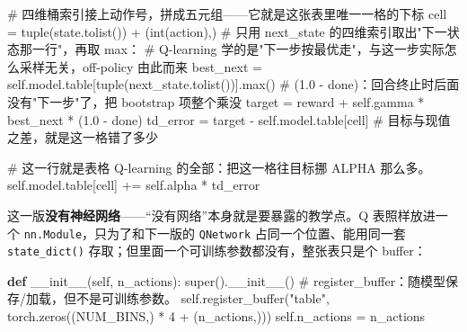 \documentclass[
  chinese,
]{ctexart}
\newenvironment{Shaded}{\begin{snugshade}}{\end{snugshade}}
\newcommand{\BuiltInTok}[1]{\textcolor[rgb]{0.00,0.23,0.31}{#1}}
\newcommand{\CommentTok}[1]{\textcolor[rgb]{0.37,0.37,0.37}{#1}}
\newcommand{\DecValTok}[1]{\textcolor[rgb]{0.68,0.00,0.00}{#1}}
\newcommand{\FloatTok}[1]{\textcolor[rgb]{0.68,0.00,0.00}{#1}}
\newcommand{\FunctionTok}[1]{\textcolor[rgb]{0.28,0.35,0.67}{#1}}
\newcommand{\KeywordTok}[1]{\textcolor[rgb]{0.00,0.23,0.31}{\textbf{#1}}}
\newcommand{\NormalTok}[1]{\textcolor[rgb]{0.00,0.23,0.31}{#1}}
\newcommand{\OperatorTok}[1]{\textcolor[rgb]{0.37,0.37,0.37}{#1}}
\newcommand{\StringTok}[1]{\textcolor[rgb]{0.13,0.47,0.30}{#1}}
\newcommand{\VariableTok}[1]{\textcolor[rgb]{0.07,0.07,0.07}{#1}}
\begin{document}
\begin{Shaded}
\begin{Highlighting}[]
        \CommentTok{\# 四维桶索引接上动作号，拼成五元组——它就是这张表里唯一一格的下标}
\NormalTok{        cell }\OperatorTok{=} \BuiltInTok{tuple}\NormalTok{(state.tolist()) }\OperatorTok{+}\NormalTok{ (}\BuiltInTok{int}\NormalTok{(action),)}
        \CommentTok{\# 只用 next\_state 的四维索引取出"下一状态那一行"，再取 max：}
        \CommentTok{\# Q{-}learning 学的是"下一步按最优走"，与这一步实际怎么采样无关，off{-}policy 由此而来}
\NormalTok{        best\_next }\OperatorTok{=} \VariableTok{self}\NormalTok{.model.table[}\BuiltInTok{tuple}\NormalTok{(next\_state.tolist())].}\BuiltInTok{max}\NormalTok{()}
        \CommentTok{\# (1.0 {-} done)：回合终止时后面没有"下一步"了，把 bootstrap 项整个乘没}
\NormalTok{        target }\OperatorTok{=}\NormalTok{ reward }\OperatorTok{+} \VariableTok{self}\NormalTok{.gamma }\OperatorTok{*}\NormalTok{ best\_next }\OperatorTok{*}\NormalTok{ (}\FloatTok{1.0} \OperatorTok{{-}}\NormalTok{ done)}
\NormalTok{        td\_error }\OperatorTok{=}\NormalTok{ target }\OperatorTok{{-}} \VariableTok{self}\NormalTok{.model.table[cell]     }\CommentTok{\# 目标与现值之差，就是这一格错了多少}

        \CommentTok{\# 这一行就是表格 Q{-}learning 的全部：把这一格往目标挪 ALPHA 那么多。}
        \VariableTok{self}\NormalTok{.model.table[cell] }\OperatorTok{+=} \VariableTok{self}\NormalTok{.alpha }\OperatorTok{*}\NormalTok{ td\_error}
\end{Highlighting}
\end{Shaded}

这一版\textbf{没有神经网络}------``没有网络''本身就是要暴露的教学点。Q
表照样放进一个 \texttt{nn.Module}，只为了和下一版的 \texttt{QNetwork}
占同一个位置、能用同一套 \texttt{state\_dict()}
存取；但里面一个可训练参数都没有，整张表只是个 buffer：

\begin{Shaded}
\begin{Highlighting}[]
    \KeywordTok{def} \FunctionTok{\_\_init\_\_}\NormalTok{(}\VariableTok{self}\NormalTok{, n\_actions):}
        \BuiltInTok{super}\NormalTok{().}\FunctionTok{\_\_init\_\_}\NormalTok{()}
        \CommentTok{\# register\_buffer：随模型保存/加载，但不是可训练参数。}
        \VariableTok{self}\NormalTok{.register\_buffer(}\StringTok{"table"}\NormalTok{, torch.zeros((NUM\_BINS,) }\OperatorTok{*} \DecValTok{4} \OperatorTok{+}\NormalTok{ (n\_actions,)))}
        \VariableTok{self}\NormalTok{.n\_actions }\OperatorTok{=}\NormalTok{ n\_actions}
\end{Highlighting}
\end{Shaded}
\end{document}
